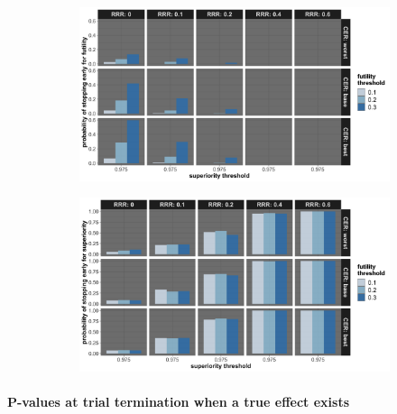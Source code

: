 \documentclass[]{article}
\let\oldparagraph\paragraph
\renewcommand{\paragraph}[1]{\oldparagraph{#1}\mbox{}}
\begin{document}
\begin{figure}
\centering
  \caption{Probability of stopping early due to futility, and stopping early due to superiority. Stopping probabilities
  are presented for the three control event rates (CER – rows), four relative risk reductions (RRR – columns), and three futility thresholds (legend).}
  \label{fig:fig}
  \begin{subfigure}{0.8\textwidth}
    \centering
    \caption{}
    \includegraphics{../p1_plots/batch_size_nb_2000/prob_stop_early_fut_p1.png}
  \end{subfigure}
  \begin{subfigure}{0.8\textwidth}
    \centering
    \caption{}
    \includegraphics{../p1_plots/batch_size_nb_2000/prob_stop_early_sup_p1.png}
  \end{subfigure}
\end{figure}

\hypertarget{p-values-at-trial-termination-when-a-true-effect-exists-1}{%
\paragraph{P-values at trial termination when a true effect
exists}\label{p-values-at-trial-termination-when-a-true-effect-exists-1}}
\end{document}

